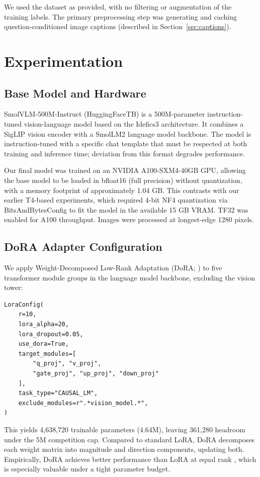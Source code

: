 \documentclass[11pt]{article}
\begin{document}
We used the dataset as provided, with no filtering or augmentation of the training labels. The primary preprocessing step was generating and caching question-conditioned image captions (described in Section~\ref{sec:captions}).

\section{Experimentation}

\subsection{Base Model and Hardware}

SmolVLM-500M-Instruct (HuggingFaceTB) is a 500M-parameter instruction-tuned vision-language model based on the Idefics3 architecture. It combines a SigLIP vision encoder with a SmolLM2 language model backbone. The model is instruction-tuned with a specific chat template that must be respected at both training and inference time; deviation from this format degrades performance.

Our final model was trained on an NVIDIA A100-SXM4-40GB GPU, allowing the base model to be loaded in bfloat16 (full precision) without quantization, with a memory footprint of approximately 1.04 GB. This contrasts with our earlier T4-based experiments, which required 4-bit NF4 quantization via BitsAndBytesConfig to fit the model in the available 15 GB VRAM. TF32 was enabled for A100 throughput. Images were processed at longest-edge 1280 pixels.

\subsection{DoRA Adapter Configuration}

We apply Weight-Decomposed Low-Rank Adaptation (DoRA; \citealt{liu2024dora}) to five transformer module groups in the language model backbone, excluding the vision tower:

\begin{verbatim}
LoraConfig(
    r=10,
    lora_alpha=20,
    lora_dropout=0.05,
    use_dora=True,
    target_modules=[
        "q_proj", "v_proj",
        "gate_proj", "up_proj", "down_proj"
    ],
    task_type="CAUSAL_LM",
    exclude_modules=r".*vision_model.*",
)
\end{verbatim}

This yields 4,638,720 trainable parameters (4.64M), leaving 361,280 headroom under the 5M competition cap. Compared to standard LoRA, DoRA decomposes each weight matrix into magnitude and direction components, updating both. Empirically, DoRA achieves better performance than LoRA at equal rank \cite{liu2024dora}, which is especially valuable under a tight parameter budget.
\end{document}
